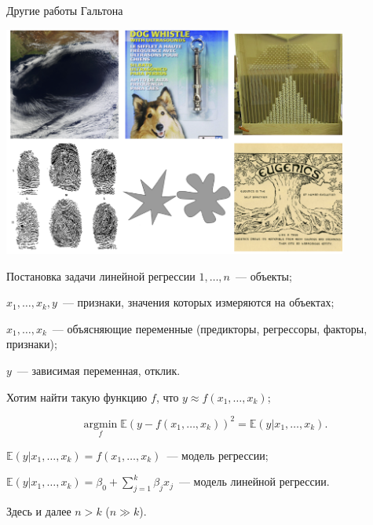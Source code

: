 \documentclass[9pt,pdf,utf8,hyperref={unicode},aspectratio=169]{beamer}
\def\argmin#1{ \mathop{\text{argmin}}\limits_{#1} }
\begin{document}
\begin{frame}{Другие работы Гальтона}
    \begin{center}
            \includegraphics[width=0.85\textwidth]{galton_other.png}
    \end{center}
\end{frame}

\begin{frame}{Постановка задачи линейной регрессии}
    $1,\dots,n$~--- объекты;

    $x_1,\dots,x_k,y$~--- признаки, значения которых измеряются на объектах;

    $x_1,\dots,x_k$~--- объясняющие переменные (предикторы, регрессоры, факторы, признаки);

    $y$~--- зависимая переменная, отклик.

    \bigskip

    Хотим найти такую функцию $f$, что $y\approx f\left(x_1,\dots,x_k\right)$;

    $$\argmin{f} \mathbb{E}\left(y-f\left(x_1,\dots,x_k\right)\right)^2 = \mathbb{E}\left(y\left|x_1,\dots,x_k\right.\right).$$

    \bigskip

    $\mathbb{E}\left(y\left|x_1,\dots,x_k\right.\right) = f\left(x_1,\dots,x_k\right)$~--- модель регрессии;

    $\mathbb{E}\left(y\left|x_1,\dots,x_k\right.\right) = \beta_0+\sum\limits_{j=1}^k \beta_j x_j$~--- модель линейной регрессии.

    \bigskip

    Здесь и далее $n>k$ ($n\gg k$).
\end{frame}
\end{document}
